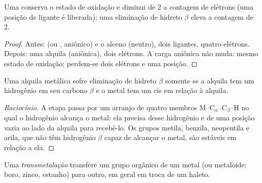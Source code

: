 \begin{proposition}\label{prop:b2:catalytic-cycles:insertion}
Uma  conserva o estado de oxidação e diminui de 2 a
contagem de elétrons (uma posição de ligante é liberada); uma eliminação de
hidreto $\beta$ eleva a contagem de 2.
\end{proposition}

\begin{proof}
Antes:  (ou , aniônico) e o alceno (neutro), dois ligantes, quatro
elétrons. Depois: uma alquila (aniônica), dois elétrons. A carga aniônica não
muda: mesmo estado de oxidação; perdem-se dois elétrons e uma posição.
\end{proof}

\begin{proposition}\label{prop:b2:catalytic-cycles:beta-h}
Uma alquila metálica sofre eliminação de hidreto $\beta$ somente se a alquila
tem um hidrogênio em seu carbono $\beta$ e o metal tem um  cis em
relação à alquila.
\end{proposition}

\begin{proof}[Raciocínio]
A etapa passa por um arranjo de quatro membros M--C$_\alpha$--C$_\beta$--H no qual
o hidrogênio alcança o metal: ela precisa desse hidrogênio e de uma posição
vazia ao lado da alquila para recebê-lo. Os grupos metila, benzila,
neopentila e arila, que não têm hidrogênio $\beta$ capaz de alcançar o metal,
são estáveis em relação a ela.
\end{proof}

\begin{definition}[Transmetalação]\label{def:b2:catalytic-cycles:transmetalation}
Uma \emph{transmetalação} transfere um grupo orgânico de
um metal (ou metaloide: boro, zinco, estanho) para outro, em geral em troca de
um haleto.
\end{definition}

